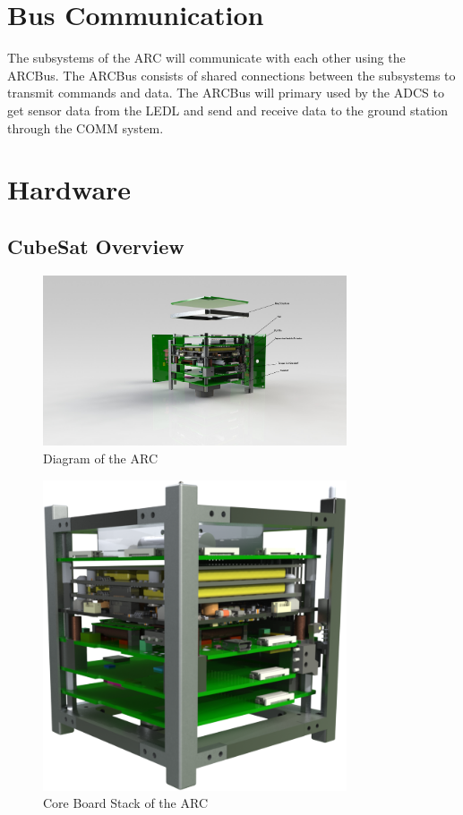 \section{Bus Communication}

The subsystems of the \ac{ARC} will communicate with each other using the ARCBus. The ARCBus consists of shared connections between the subsystems to transmit commands and data. The ARCBus will primary used by the \ac{ADCS} to get sensor data from the \ac{LEDL} and send and receive data to the ground station through the COMM system.

\section{Hardware}

\subsection{CubeSat Overview}

\begin{figure}[H]
    \centering
    \includegraphics[width=0.8\textwidth]{Figures/CubeSat-Diagram}
    \caption{Diagram of the \ac{ARC}}
\end{figure}

\begin{figure}[H]
    \centering
    \includegraphics[width=0.8\textwidth]{Figures/cubesat-core}
    \caption{Core Board Stack of the \ac{ARC}}
\end{figure}

